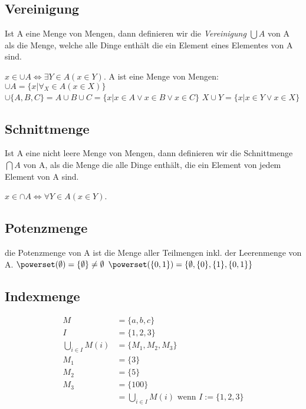 \subsection{Vereinigung}
Ist A eine Menge von Mengen, dann definieren wir die \emph{Vereinigung} \( \bigcup A\) von A als die Menge, welche alle Dinge enthält die ein Element eines Elementes von A sind.
\par \hspace*{10mm} \( x \in \cup A \Leftrightarrow \exists Y \in A(x \in Y) \).
\newline A ist eine Menge von Mengen: \newline
\hspace*{10mm}\( \cup A = \{x | \forall_X \in A (x \in X)\}\) \newline
\hspace*{10mm}\( \cup \{A, B, C\} = A \cup B \cup C = \{x|x \in A \vee x \in B \vee x \in C\}\) \newline
\hspace*{10mm}\( X \cup Y = \{ x | x \in Y \vee x \in X \}\)
\subsection{Schnittmenge}
Ist A eine nicht leere Menge von Mengen, dann definieren wir die Schnittmenge \(\bigcap A\) von A, als die Menge die alle Dinge enthält, die ein Element von jedem Element von A sind.
\par \hspace*{10mm} \( x \in \cap A \Leftrightarrow \forall Y \in A(x \in Y) \).
\subsection{Potenzmenge}
die Potenzmenge von A ist die Menge aller Teilmengen inkl. der Leerenmenge von A. \newline
\( \powerset(\emptyset) = \{\emptyset\} \neq \emptyset \) \newline
\( \powerset(\{0, 1\}) = \{\emptyset, \{0\}, \{1\}, \{0,1\}\} \)
\subsection{Indexmenge} %
\label{sub:indexmenge}
\begin{align*}
	M &= \{a, b, c\} \\
	I &= \{1, 2, 3\} \\
	\bigcup_{i \in I} M(i) &= \{ M_1, M_2, M_3 \} \\
	M_1 &= \{3\} \\
	M_2 &= \{5\} \\
	M_3 &= \{100\} \\
	&= \bigcup_{i \in I} M(i) \text{ wenn } I:=\{1,2,3\}
\end{align*}
